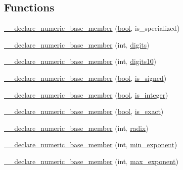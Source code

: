 \subsection*{Functions}
\begin{DoxyCompactItemize}
\item 
\hyperlink{limits-hack_8h_a4b6b95655fe47f8f248b45eeab2573a8}{\+\_\+\+\_\+declare\+\_\+numeric\+\_\+base\+\_\+member} (\hyperlink{compiler_8h_abb452686968e48b67397da5f97445f5b}{bool}, is\+\_\+specialized)
\item 
\hyperlink{limits-hack_8h_adb53162703702e90a5df33acc2dff591}{\+\_\+\+\_\+declare\+\_\+numeric\+\_\+base\+\_\+member} (int, \hyperlink{numinquire_8h_a76a0faf7aefa53527cce92a7a96d8e07}{digits})
\item 
\hyperlink{limits-hack_8h_a94208783e83b0f6cada4326f606b90f4}{\+\_\+\+\_\+declare\+\_\+numeric\+\_\+base\+\_\+member} (int, \hyperlink{numinquire_8h_aba621087a8b1529462d180fa6cac4a5d}{digits10})
\item 
\hyperlink{limits-hack_8h_abdd49640fdc5e168e94e1ac20e89f617}{\+\_\+\+\_\+declare\+\_\+numeric\+\_\+base\+\_\+member} (\hyperlink{compiler_8h_abb452686968e48b67397da5f97445f5b}{bool}, \hyperlink{numinquire_8h_ae60c5a6ee78f454551ef8a312fb9479c}{is\+\_\+signed})
\item 
\hyperlink{limits-hack_8h_ac2c608924500298c998620305bc13954}{\+\_\+\+\_\+declare\+\_\+numeric\+\_\+base\+\_\+member} (\hyperlink{compiler_8h_abb452686968e48b67397da5f97445f5b}{bool}, \hyperlink{numinquire_8h_aec09c316d35c523e356e6d34e7f974b6}{is\+\_\+integer})
\item 
\hyperlink{limits-hack_8h_addd336dbe817e23ef83e9ad36d722c4f}{\+\_\+\+\_\+declare\+\_\+numeric\+\_\+base\+\_\+member} (\hyperlink{compiler_8h_abb452686968e48b67397da5f97445f5b}{bool}, \hyperlink{numinquire_8h_a1afdd1269713b8a31cc3cf4558097888}{is\+\_\+exact})
\item 
\hyperlink{limits-hack_8h_ad4191e4ea46c0deae688a57f253a5971}{\+\_\+\+\_\+declare\+\_\+numeric\+\_\+base\+\_\+member} (int, \hyperlink{numinquire_8h_a7f3f274d8e16df7db5fb23c81be22170}{radix})
\item 
\hyperlink{limits-hack_8h_a9fe432bcd177c320d4058fecd77c02ab}{\+\_\+\+\_\+declare\+\_\+numeric\+\_\+base\+\_\+member} (int, \hyperlink{numinquire_8h_ac302226dab4d3e25159a46f68a5d1522}{min\+\_\+exponent})
\item 
\hyperlink{limits-hack_8h_a6ef0310969443c4905138ee17565af55}{\+\_\+\+\_\+declare\+\_\+numeric\+\_\+base\+\_\+member} (int, \hyperlink{numinquire_8h_a0d191d85c06341ded93a22c602f0604b}{max\+\_\+exponent})

\end{DoxyCompactItemize}
